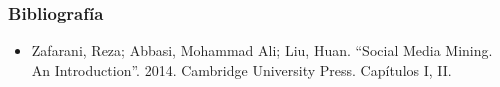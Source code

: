 \documentclass[
10pt, %
aspectratio=169, %
]{beamer}
\begin{document}
	\begin{frame}
		
		\frametitle{Bibliografía}
		
		\begin{itemize}
						
			\item Zafarani, Reza; Abbasi, Mohammad Ali; Liu, Huan. ``Social Media Mining. An Introduction''. 2014. Cambridge University Press. Capítulos I, II.
			     
		\end{itemize}
		
	\end{frame}
	
	\begin{frame}
		\titlepage
	\end{frame}
	
	
	
\end{document}
